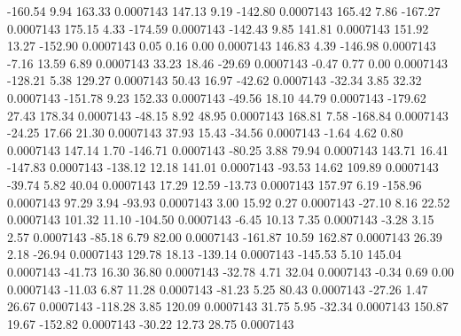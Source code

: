      -160.54        9.94      163.33     0.0007143
      147.13        9.19     -142.80     0.0007143
      165.42        7.86     -167.27     0.0007143
      175.15        4.33     -174.59     0.0007143
     -142.43        9.85      141.81     0.0007143
      151.92       13.27     -152.90     0.0007143
        0.05        0.16        0.00     0.0007143
      146.83        4.39     -146.98     0.0007143
       -7.16       13.59        6.89     0.0007143
       33.23       18.46      -29.69     0.0007143
       -0.47        0.77        0.00     0.0007143
     -128.21        5.38      129.27     0.0007143
       50.43       16.97      -42.62     0.0007143
      -32.34        3.85       32.32     0.0007143
     -151.78        9.23      152.33     0.0007143
      -49.56       18.10       44.79     0.0007143
     -179.62       27.43      178.34     0.0007143
      -48.15        8.92       48.95     0.0007143
      168.81        7.58     -168.84     0.0007143
      -24.25       17.66       21.30     0.0007143
       37.93       15.43      -34.56     0.0007143
       -1.64        4.62        0.80     0.0007143
      147.14        1.70     -146.71     0.0007143
      -80.25        3.88       79.94     0.0007143
      143.71       16.41     -147.83     0.0007143
     -138.12       12.18      141.01     0.0007143
      -93.53       14.62      109.89     0.0007143
      -39.74        5.82       40.04     0.0007143
       17.29       12.59      -13.73     0.0007143
      157.97        6.19     -158.96     0.0007143
       97.29        3.94      -93.93     0.0007143
        3.00       15.92        0.27     0.0007143
      -27.10        8.16       22.52     0.0007143
      101.32       11.10     -104.50     0.0007143
       -6.45       10.13        7.35     0.0007143
       -3.28        3.15        2.57     0.0007143
      -85.18        6.79       82.00     0.0007143
     -161.87       10.59      162.87     0.0007143
       26.39        2.18      -26.94     0.0007143
      129.78       18.13     -139.14     0.0007143
     -145.53        5.10      145.04     0.0007143
      -41.73       16.30       36.80     0.0007143
      -32.78        4.71       32.04     0.0007143
       -0.34        0.69        0.00     0.0007143
      -11.03        6.87       11.28     0.0007143
      -81.23        5.25       80.43     0.0007143
      -27.26        1.47       26.67     0.0007143
     -118.28        3.85      120.09     0.0007143
       31.75        5.95      -32.34     0.0007143
      150.87       19.67     -152.82     0.0007143
      -30.22       12.73       28.75     0.0007143
